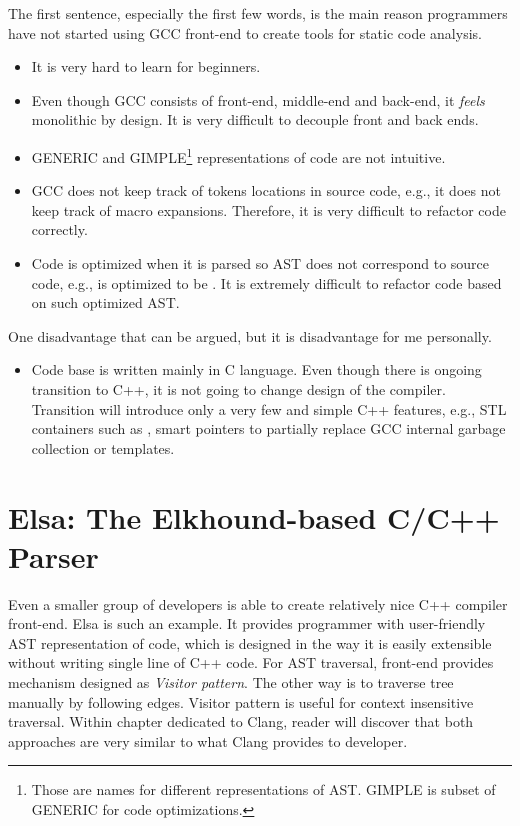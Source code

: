 The first sentence, especially the first few words, is the main reason programmers have not started using GCC front-end to create tools for static code analysis.

\begin{itemize}
\item It is very hard to learn for beginners.

\item Even though GCC consists of front-end, middle-end and back-end, it \textit{feels} monolithic by design. It is very difficult to decouple front and back ends.

\item GENERIC and GIMPLE\footnote{Those are names for different representations of AST. GIMPLE is subset of GENERIC for code optimizations.} representations of code are not intuitive.

\item GCC does not keep track of tokens locations in source code, e.g., it does not keep track of macro expansions. Therefore, it is very difficult to refactor code correctly.

\item Code is optimized when it is parsed so AST does not correspond to source code, e.g.,  is optimized to be . It is extremely difficult to refactor code based on such optimized AST.
\end{itemize}

One disadvantage that can be argued, but it is disadvantage for me personally.

\begin{itemize}
\item Code base is written mainly in C language. Even though there is ongoing transition to C++, it is not going to change design of the compiler. Transition will introduce only a very few and simple C++ features, e.g., STL containers such as , smart pointers to partially replace GCC internal garbage collection or templates.
\end{itemize}

\section{Elsa: The Elkhound-based C/C++ Parser}
Even a smaller group of developers is able to create relatively nice C++ compiler front-end. Elsa is such an example. It provides programmer with user-friendly AST representation of code, which is designed in the way it is easily extensible without writing single line of C++ code. For AST traversal, front-end provides mechanism designed as \emph{Visitor pattern}. The other way is to traverse tree manually by following edges. Visitor pattern is useful for context insensitive traversal. Within chapter dedicated to Clang, reader will discover that both approaches are very similar to what Clang provides to developer.

